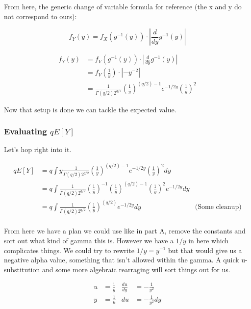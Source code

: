 From here, the generic change of variable formula for reference (the x and y do not correspond to ours):

$$
f_Y(y) = f_X(g^{-1}(y)) \cdot \left\vert \frac{d}{dy} g^{-1}(y)\right\vert
$$

\vspace{-0.4cm}
\begin{align*}
	f_Y(y) &= f_V(g^{-1}(y)) \cdot \left| \frac{d}{dy} g^{-1}(y) \right| \\
	&= f_V\left( \frac{1}{y} \right) \cdot |-y^{-2}| \\
	&= \frac{1}{\Gamma(q/2)2^{q/2}} \left( \frac{1}{y} \right)^{(q/2) - 1} e^{-1/2y} \left( \frac{1}{y} \right)^2
\end{align*}

Now that setup is done we can tackle the expected value.

\subsubsection*{Evaluating $qE[Y]$}

Let's hop right into it. 

\vspace{-0.4cm}
\begin{align*}
qE[Y] &= q\int y \frac{1}{\Gamma(q/2)2^{q/2}} \left( \frac{1}{y} \right)^{(q/2) - 1} e^{-1/2y} \left( \frac{1}{y} \right)^2 dy \\
	&= q\int \frac{1}{\Gamma(q/2)2^{q/2}}  \left( \frac{1}{y} \right)^{-1} \left( \frac{1}{y} \right)^{(q/2) - 1} \left( \frac{1}{y} \right)^2  e^{-1/2y} dy \\
	&= q\int \frac{1}{\Gamma(q/2)2^{q/2}} \left( \frac{1}{y} \right)^{(q/2)} e^{-1/2y} dy & \text{(Some cleanup)} \\
\end{align*}

From here we have a plan we could use like in part A, remove the constants and sort out what kind of gamma this is. However we have a $1/y$ in here which complicates things. We could try to rewrite $1/y=y^{-1}$ but that would give us a negative alpha value, something that isn't allowed within the gamma. A quick u-substitution and some more algebraic rearraging will sort things out for us. 

\vspace{-0.4cm}
\begin{align*}
	u &= \frac{1}{y} & \frac{du}{dy} &= -\frac{1}{y^2} \\
	y &= \frac{1}{u} & du &= -\frac{1}{y^2} dy
\end{align*}

